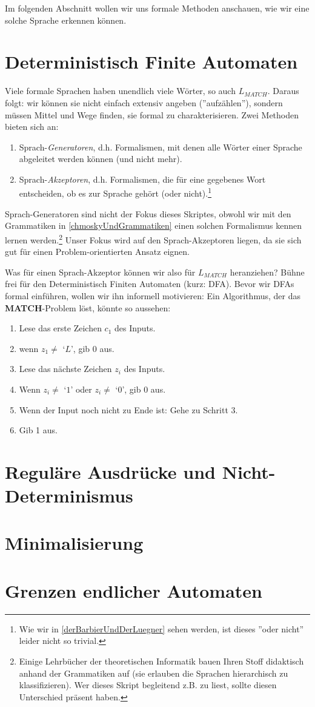 Im folgenden Abschnitt wollen wir uns formale Methoden anschauen,
wie wir eine solche Sprache erkennen können.

\section{Deterministisch Finite Automaten}
Viele formale Sprachen haben unendlich viele Wörter,
so auch $L_{MATCH}$.
Daraus folgt: wir können sie nicht einfach extensiv angeben (''aufzählen''),
sondern müssen Mittel und Wege finden, sie formal zu charakterisieren.
Zwei Methoden bieten sich an:
\begin{enumerate}
    \item Sprach-\emph{Generatoren}, d.h. Formalismen,
        mit denen alle Wörter einer Sprache abgeleitet werden können
        (und nicht mehr).
    \item Sprach-\emph{Akzeptoren}, d.h. Formalismen,
        die für eine gegebenes Wort entscheiden,
        ob es zur Sprache gehört (oder nicht).\footnote{
            Wie wir in \autoref{derBarbierUndDerLuegner} sehen werden,
            ist dieses ''oder nicht'' leider nicht so trivial.}
\end{enumerate}

Sprach-Generatoren sind nicht der Fokus dieses Skriptes, obwohl wir mit den Grammatiken
in \autoref{chmoskyUndGrammatiken} einen solchen Formalismus kennen lernen werden.\footnote{
Einige Lehrbücher der theoretischen Informatik bauen Ihren Stoff didaktisch anhand der Grammatiken
auf (sie erlauben die Sprachen hierarchisch zu klassifizieren).
Wer dieses Skript begleitend z.B. zu \cite{schoening} liest,
sollte diesen Unterschied präsent haben.}
Unser Fokus wird auf den Sprach-Akzeptoren liegen,
da sie sich gut für einen Problem-orientierten Ansatz eignen.

Was für einen Sprach-Akzeptor können wir also für $L_{MATCH}$ heranziehen?
Bühne frei für den Deterministisch Finiten Automaten (kurz: DFA).
Bevor wir DFAs formal einführen, wollen wir ihn informell motivieren: 
Ein Algorithmus, der das \textbf{MATCH}-Problem löst, könnte so aussehen:
\begin{enumerate}
    \item Lese das erste Zeichen $c_1$ des Inputs.
    \item wenn $z_1 \neq $ `$L$', gib 0 aus.
    \item Lese das nächste Zeichen $z_i$ des Inputs.
    \item Wenn $z_i \neq $ `$1$' oder $z_i \neq $ `$0$', gib 0 aus.
    \item Wenn der Input noch nicht zu Ende ist: Gehe zu Schritt 3.
    \item Gib 1 aus.
\end{enumerate}

\section{Reguläre Ausdrücke und Nicht-Determinismus}
\section{Minimalisierung}
\section{Grenzen endlicher Automaten}
